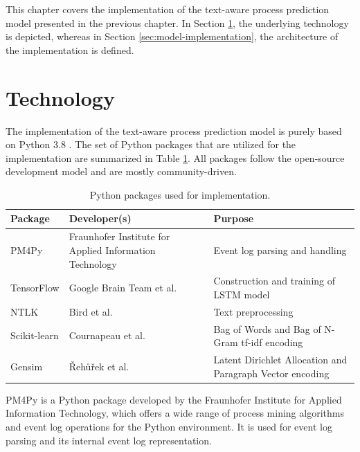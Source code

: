 This chapter covers the implementation of the text-aware process prediction model presented in the previous chapter.
In Section \ref{sec:technology}, the underlying technology is depicted, whereas in Section \ref{sec:model-implementation}, the architecture of the implementation is defined.

\section{Technology}\label{sec:technology}

The implementation of the text-aware process prediction model is purely based on Python 3.8 \cite{python}.
The set of Python packages that are utilized for the implementation are summarized in Table \ref{tab:packages}.
All packages follow the open-source development model and are mostly community-driven.

\begin{table}[!htbp]
	\begin{tabularx}{\textwidth}{l p{4.5cm} p{6.6cm} }
		\toprule
		\textbf{Package} & \textbf{Developer(s)} & \textbf{Purpose}  \\
		\midrule
		PM4Py \cite{DBLP:journals/corr/abs-1905-06169}   &  Fraunhofer Institute for Applied Information Technology &  Event log parsing and handling\\
		TensorFlow \cite{DBLP:journals/corr/AbadiABBCCCDDDG16} &  Google Brain Team et al.& Construction and training of LSTM model \\
		NTLK \cite{DBLP:books/daglib/0022921} & Bird et al. & Text preprocessing\\
		Scikit-learn \cite{DBLP:journals/jmlr/PedregosaVGMTGBPWDVPCBPD11} & Cournapeau et al.& Bag of Words and Bag of N-Gram tf-idf encoding \\
		Gensim \cite{rehurek_lrec} & Řehůřek et al. & Latent Dirichlet Allocation and Paragraph Vector encoding \\
		 \bottomrule
	\end{tabularx}
	\caption[Python packages used for implementation]{Python packages used for implementation.}
	\label{tab:packages}
\end{table}

PM4Py \cite{DBLP:journals/corr/abs-1905-06169} is a Python package developed by the Fraunhofer Institute for Applied Information Technology, which offers a wide range of process mining algorithms and event log operations for the Python environment.
It is used for event log parsing and its internal event log representation.

